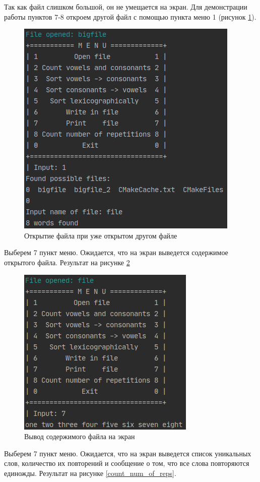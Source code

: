\documentclass[12pt,a4paper]{article}  %
\begin{document}
Так как файл слишком большой, он не умещается на экран. Для демонстрации работы пунктов 7-8 откроем другой файл с помощью пункта меню 1 (рисунок \ref{reopen}).

\begin{figure}[htp!]
	\centering
	\includegraphics[width=0.5\linewidth]{photo/tests/reopen}
	\caption{Открытие файла при уже открытом другом файле}
	\label{reopen}
\end{figure}

Выберем 7 пункт меню. Ожидается, что на экран выведется содержимое открытого файла. Результат на рисунке \ref{print}

\begin{figure}[htp!]
	\centering
	\includegraphics[width=0.5\linewidth]{photo/tests/print}
	\caption{Вывод содержимого файла на экран}
	\label{print}
\end{figure}

Выберем 7 пункт меню. Ожидается, что на экран выведется список уникальных слов, количество их повторений и сообщение о том, что все слова повторяются единожды. Результат на рисунке \ref{count_num_of_reps}. 
\end{document}
